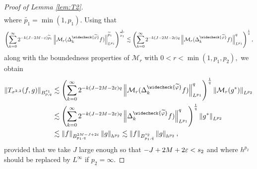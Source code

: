 \begin{proof}[Proof of Lemma \ref{lem:T2}]
\begin{align*}
\end{align*}
where $\widetilde{p_1}=\min(1,p_1).$ Using that
$$
\left(\sum\limits_{k=0}^\infty 2^{-k (J-2M-\eps)\widetilde{p}_1} \norm{\mathcal{M}_r(\Delta^{\widecheck{\widetilde{\f}}}_k f)}{L^{p_1}}^{\widetilde{p}_1} \right)^{\frac{1}{\widetilde{p}_1}}\lesssim \left( \sum\limits_{k=0}^\infty 2^{-k  (J-2M -2\eps)q} \norm{\mathcal{M}_r(\Delta^{\widecheck{\widetilde{\f}}}_k f)}{L^{p_1}}^q  \right)^\frac{1}{q},
$$
along with  the boundedness properties of $\mathcal{M}_r$ with $0<r<\min(1,p_1,p_2),$ we obtain
\begin{align*}
\norm{T_{\sigma^{2,2}}(f,g)}{\ibes{p}{s_1}{q}} & \lesssim \left( \sum\limits_{k=0}^\infty 2^{-k  (J-2M -2\eps)q} \norm{\mathcal{M}_r(\Delta^{\widecheck{\widetilde{\f}}}_k f)}{L^{p_1}}^q  \right)^\frac{1}{q}\norm{\mathcal{M}_r(g^*)}{L^{p_2}}\\
& \lesssim \left( \sum\limits_{k=0}^\infty 2^{-k  (J-2M -2\eps)q} \norm{\Delta^{\widecheck{\widetilde{\f}}}_k f)}{L^{p_1}}^q  \right)^\frac{1}{q} \norm{g^*}{L^{p_2}}\\
& \lesssim \norm{f}{\ibes{p_1}{2M -J +2\eps}{q}} \norm{g}{h^{p_2}} \lesssim  \norm{f}{\ibes{p_1}{s_2}{\bar{q}}} \norm{g}{h^{p_2}},
\end{align*}
provided that we take $J$ large enough so that $-J +2M +2\varepsilon < s_2$ and where $h^{p_2}$ should be replaced by $L^\infty$ if $p_2=\infty.$
\end{proof}

